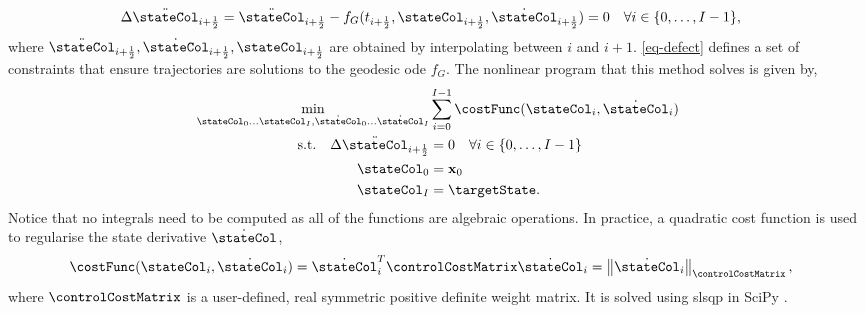 \documentclass{mimosis-class/mimosis}
\numberwithin{equation}{chapter}
\newcommand{\state}{\ensuremath{\mathbf{x}}}
\begin{document}
{\begin{align} \label{eq-defect}
\Delta\ddot{\stateCol}_{i+\frac{1}{2}} &= \ddot{\stateCol}_{i+\frac{1}{2}} - f_G(t_{i+\frac{1}{2}}, \stateCol_{i+\frac{1}{2}}, \dot{\stateCol}_{i+\frac{1}{2}}) = 0 \quad \forall i \in  \{ 0, \ldots, I-1\},
\end{align}
where \(\ddot{\stateCol}_{i+\frac{1}{2}}, \dot{\stateCol}_{i+\frac{1}{2}}, \stateCol_{i+\frac{1}{2}}\)
are obtained by interpolating between \(i\) and \(i+1\).
\cref{eq-defect} defines a set of constraints that ensure trajectories are solutions
to the geodesic \acrshort{ode} \(f_G\).
The nonlinear program that this method solves is given by,
\begin{subequations} \label{eq-collocation-problem}
\begin{align}
\min_{\stateCol_0 \ldots \stateCol_I, \dot{\stateCol}_0 \ldots \dot{\stateCol}_I}& \sum_{i=0}^{I-1}
\costFunc(\stateCol_i, \dot{\stateCol}_i ) \\
\text{s.t.} \quad
\Delta\ddot{\stateCol}_{i+\frac{1}{2}} &= 0 \quad \forall i \in \{0, \ldots, I-1\} \\
\stateCol_0 &= \state_0 \\
\stateCol_I &= \targetState.
\end{align}
\end{subequations}
Notice that no integrals need to be computed as all of the functions are algebraic operations.
In practice, a quadratic cost function is used to regularise the state derivative \(\dot{\stateCol}\),
\begin{align} \label{eq-quadratic-cost-state-derivative}
\costFunc(\stateCol_i, \dot{\stateCol}_i)
&= \dot{\stateCol}_i^T \controlCostMatrix \dot{\stateCol}_i
= \left\| \dot{\stateCol}_i \right\|_{\controlCostMatrix},
\end{align}
where \(\controlCostMatrix\) is a user-defined, real symmetric positive definite weight matrix.
It is solved using \acrfull{slsqp} in SciPy \citep{2020SciPy-NMeth}.

}
\end{document}
